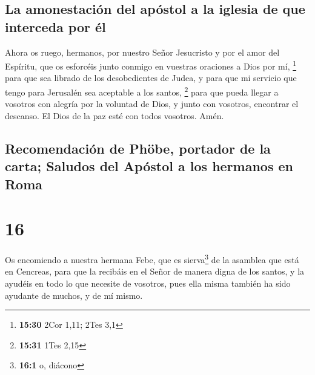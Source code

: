 \hypertarget{la-amonestaciuxf3n-del-apuxf3stol-a-la-iglesia-de-que-interceda-por-uxe9l}{%
\subsection{La amonestación del apóstol a la iglesia de que interceda
por
él}\label{la-amonestaciuxf3n-del-apuxf3stol-a-la-iglesia-de-que-interceda-por-uxe9l}}

 Ahora os ruego, hermanos, por nuestro Señor Jesucristo y
por el amor del Espíritu, que os esforcéis junto conmigo en vuestras
oraciones a Dios por mí, \footnote{\textbf{15:30} 2Cor 1,11; 2Tes 3,1}
 para que sea librado de los desobedientes de Judea, y
para que mi servicio que tengo para Jerusalén sea aceptable a los
santos, \footnote{\textbf{15:31} 1Tes 2,15}  para que
pueda llegar a vosotros con alegría por la voluntad de Dios, y junto con
vosotros, encontrar el descanso.  El Dios de la paz esté
con todos vosotros. Amén.

\hypertarget{recomendaciuxf3n-de-phuxf6be-portador-de-la-carta-saludos-del-apuxf3stol-a-los-hermanos-en-roma}{%
\subsection{Recomendación de Phöbe, portador de la carta; Saludos del
Apóstol a los hermanos en
Roma}\label{recomendaciuxf3n-de-phuxf6be-portador-de-la-carta-saludos-del-apuxf3stol-a-los-hermanos-en-roma}}

\hypertarget{section-15}{%
\section{16}\label{section-15}}

 Os encomiendo a nuestra hermana Febe, que es
sierva\footnote{\textbf{16:1} o, diácono} de la asamblea que está en
Cencreas,  para que la recibáis en el Señor de manera
digna de los santos, y la ayudéis en todo lo que necesite de vosotros,
pues ella misma también ha sido ayudante de muchos, y de mí mismo.

